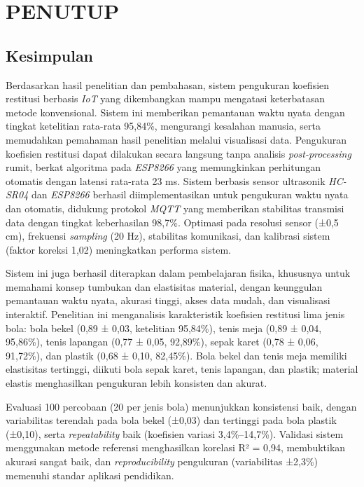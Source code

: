 \chapter{PENUTUP}

\section{Kesimpulan}

Berdasarkan hasil penelitian dan pembahasan, sistem pengukuran koefisien restitusi berbasis \textit{IoT} yang dikembangkan mampu mengatasi keterbatasan metode konvensional. Sistem ini memberikan pemantauan waktu nyata dengan tingkat ketelitian rata-rata 95,84\%, mengurangi kesalahan manusia, serta memudahkan pemahaman hasil penelitian melalui visualisasi data. Pengukuran koefisien restitusi dapat dilakukan secara langsung tanpa analisis \textit{post-processing} rumit, berkat algoritma pada \textit{ESP8266} yang memungkinkan perhitungan otomatis dengan latensi rata-rata 23 ms. Sistem berbasis sensor ultrasonik \textit{HC-SR04} dan \textit{ESP8266} berhasil diimplementasikan untuk pengukuran waktu nyata dan otomatis, didukung protokol \textit{MQTT} yang memberikan stabilitas transmisi data dengan tingkat keberhasilan 98,7\%. Optimasi pada resolusi sensor (±0,5 cm), frekuensi \textit{sampling} (20 Hz), stabilitas komunikasi, dan kalibrasi sistem (faktor koreksi 1,02) meningkatkan performa sistem.

Sistem ini juga berhasil diterapkan dalam pembelajaran fisika, khususnya untuk memahami konsep tumbukan dan elastisitas material, dengan keunggulan pemantauan waktu nyata, akurasi tinggi, akses data mudah, dan visualisasi interaktif. Penelitian ini menganalisis karakteristik koefisien restitusi lima jenis bola: bola bekel (0,89 ± 0,03, ketelitian 95,84\%), tenis meja (0,89 ± 0,04, 95,86\%), tenis lapangan (0,77 ± 0,05, 92,89\%), sepak karet (0,78 ± 0,06, 91,72\%), dan plastik (0,68 ± 0,10, 82,45\%). Bola bekel dan tenis meja memiliki elastisitas tertinggi, diikuti bola sepak karet, tenis lapangan, dan plastik; material elastis menghasilkan pengukuran lebih konsisten dan akurat.

Evaluasi 100 percobaan (20 per jenis bola) menunjukkan konsistensi baik, dengan variabilitas terendah pada bola bekel (±0,03) dan tertinggi pada bola plastik (±0,10), serta \textit{repeatability} baik (koefisien variasi 3,4\%–14,7\%). Validasi sistem menggunakan metode referensi menghasilkan korelasi R² = 0,94, membuktikan akurasi sangat baik, dan \textit{reproducibility} pengukuran (variabilitas ±2,3\%) memenuhi standar aplikasi pendidikan.

